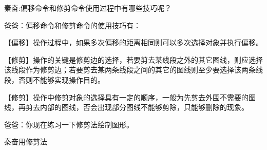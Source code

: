 秦奋:偏移命令和修剪命令使用过程中有哪些技巧呢？

爸爸：偏移命令和修剪命令的使用技巧有：
\begin{tips}
\item 【偏移】操作过程中，如果多次偏移的距离相同则可以多次选择对象并执行偏移。
\item 【修剪】操作的关键是修剪边的选择，若要剪去某线段之外的其它图线，则应选择该线段作为修剪边；若要剪去某两条线段之间的其它的图线则至少要选择该两条线段，否则不能够实现操作目的。
\item 【修剪】操作中修剪对象的选择具有一定的顺序，一般为先剪去外围不需要的图线，再剪去内部的图线，否会出现部分图线不能够剪除，只能够删除的现象。
\end{tips}

爸爸：你现在练习一下修剪法绘制图形。

秦奋用修剪法
\endinput